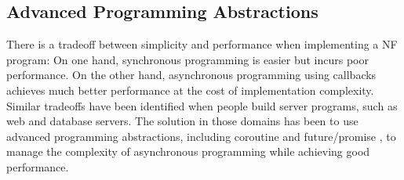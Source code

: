 



\subsection{Advanced Programming Abstractions}

There is a tradeoff between simplicity and performance when implementing a NF program: On one hand, synchronous programming is easier but incurs poor performance. On the other hand, asynchronous programming using callbacks achieves much better performance at the cost of implementation complexity. Similar tradeoffs have been identified when people build server programs, such as web \cite{tornado-web-server} and database servers\cite{rethinkdb}.
The solution in those domains has been to use advanced programming abstractions, including coroutine \cite{coroutine} and future/promise \cite{claessen1999poor, li2007combining, wtf, syme2011f}, to manage the complexity of asynchronous programming while achieving good performance.


